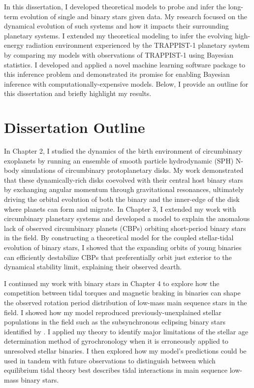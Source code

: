 In this dissertation, I developed theoretical models to probe and infer the long-term evolution of single and binary stars given data. My research focused on the dynamical evolution of such systems and how it impacts their surrounding planetary systems. I extended my theoretical modeling to infer the evolving high-energy radiation environment experienced by the TRAPPIST-1 planetary system by comparing my models with observations of TRAPPIST-1 using Bayesian statistics. I developed and applied a novel machine learning software package to this inference problem and demonstrated its promise for enabling Bayesian inference with computationally-expensive models. Below, I provide an outline for this dissertation and briefly highlight my results. 

\section{Dissertation Outline}

In Chapter 2, I studied the dynamics of the birth environment of circumbinary exoplanets by running an ensemble of smooth particle hydrodynamic (SPH) N-body simulations of circumbinary protoplanetary disks. My work demonstrated that these dynamically-rich disks coevolved with their central host binary stars by exchanging angular momentum through gravitational resonances, ultimately driving the orbital evolution of both the binary and the inner-edge of the disk where planets can form and migrate. In Chapter 3, I extended my work with circumbinary planetary systems and developed a model to explain the anomalous lack of observed circumbinary planets (CBPs) orbiting short-period binary stars in the \kepler field. By constructing a theoretical model for the coupled stellar-tidal evolution of binary stars, I showed that the expanding orbits of young binaries can efficiently destabilize CBPs that preferentially orbit just exterior to the dynamical stability limit, explaining their observed dearth.

I continued my work with binary stars in Chapter 4 to explore how the competition between tidal torques and magnetic braking in binaries can shape the observed rotation period distribution of low-mass main sequence stars in the \kepler field. I showed how my model reproduced previously-unexplained stellar populations in the \kepler field such as the subsynchronous eclipsing binary stars identified by \citet{Lurie2017}. I applied my theory to identify major limitations of the stellar age determination method of gyrochronology when it is erroneously applied to unresolved stellar binaries. I then explored how my model's predictions could be used in tandem with future observations to distinguish between which equilibrium tidal theory best describes tidal interactions in main sequence low-mass binary stars.

